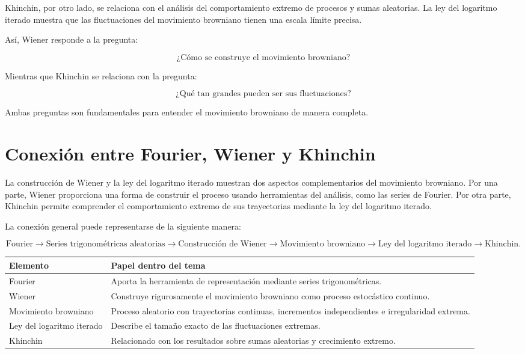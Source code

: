 \documentclass[12pt]{article}
\begin{document}
Khinchin, por otro lado, se relaciona con el análisis del comportamiento extremo de procesos y sumas aleatorias. La ley del logaritmo iterado muestra que las fluctuaciones del movimiento browniano tienen una escala límite precisa.

Así, Wiener responde a la pregunta:

\[
\text{¿Cómo se construye el movimiento browniano?}
\]

Mientras que Khinchin se relaciona con la pregunta:

\[
\text{¿Qué tan grandes pueden ser sus fluctuaciones?}
\]

Ambas preguntas son fundamentales para entender el movimiento browniano de manera completa.

\section{Conexión entre Fourier, Wiener y Khinchin}

La construcción de Wiener y la ley del logaritmo iterado muestran dos aspectos complementarios del movimiento browniano. Por una parte, Wiener proporciona una forma de construir el proceso usando herramientas del análisis, como las series de Fourier. Por otra parte, Khinchin permite comprender el comportamiento extremo de sus trayectorias mediante la ley del logaritmo iterado.

La conexión general puede representarse de la siguiente manera:

\[
\text{Fourier}
\rightarrow
\text{Series trigonométricas aleatorias}
\rightarrow
\text{Construcción de Wiener}
\rightarrow
\text{Movimiento browniano}
\rightarrow
\text{Ley del logaritmo iterado}
\rightarrow
\text{Khinchin}.
\]

\begin{center}
\begin{tabular}{p{4cm} p{9cm}}
\toprule
\textbf{Elemento} & \textbf{Papel dentro del tema} \\
\midrule
Fourier & Aporta la herramienta de representación mediante series trigonométricas. \\
Wiener & Construye rigurosamente el movimiento browniano como proceso estocástico continuo. \\
Movimiento browniano & Proceso aleatorio con trayectorias continuas, incrementos independientes e irregularidad extrema. \\
Ley del logaritmo iterado & Describe el tamaño exacto de las fluctuaciones extremas. \\
Khinchin & Relacionado con los resultados sobre sumas aleatorias y crecimiento extremo. \\
\bottomrule
\end{tabular}
\end{center}
\end{document}
